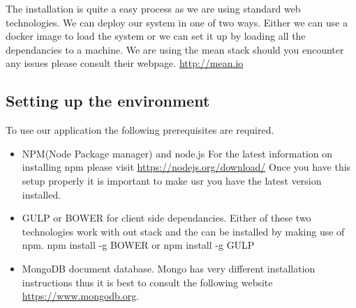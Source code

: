 The installation is quite a easy process as we are using standard web technologies. We can deploy our system in one of two ways. Either we can use a docker image to load the system or we can set it up by loading all the dependancies to a machine. We are using the mean stack should you encounter any issues please consult their webpage. \url{http://mean.io}
\subsection{Setting up the environment}
To use our application the following prerequisites are required.
\begin{itemize}
	\item NPM(Node Package manager) and node.js 
	For the latest information on installing npm please visit \url{https://nodejs.org/download/} Once you have this setup properly it is important to make usr you have the latest version installed.
	\item GULP or BOWER for client side dependancies.
	Either of these two technologies work with out stack and the can be installed by making use of npm.
	\newline
	npm install -g BOWER or npm install -g GULP 
	\item MongoDB document database. Mongo has very different installation instructions thus it is best to consult the following website \url{https://www.mongodb.org}.
	
\end{itemize}

